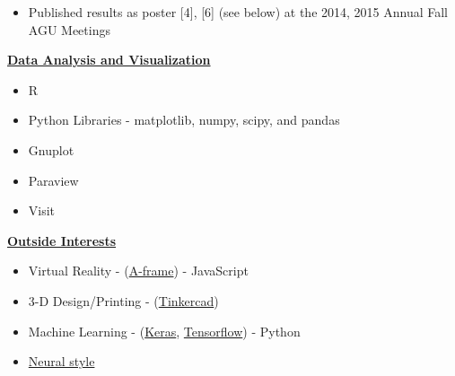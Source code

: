\documentclass[11pt]{ltxdoc}
\begin{document}
\begin{description}
\begin{description}
\begin{itemize}
\begin{itemize}
          	\item Published results as poster [4], [6] (see below) at the 2014, 2015 Annual Fall AGU Meetings
          	
          \end{itemize}
           

      \end{itemize}

    
    \end{description}
    
    \item[] \textbf{\underline{Data Analysis and Visualization}}
    
      \begin{itemize}
      	    	
        \item R
       
        \item Python Libraries - matplotlib, numpy, scipy, and pandas
        
        \item Gnuplot
        
        \item Paraview 
        
        \item Visit
        
        
      \end{itemize}
  
    
    \item[] \textbf{\underline{Outside Interests}}
    
      \begin{itemize}
        \item Virtual Reality - (\href{https://aframe.io/}{A-frame}) - JavaScript
        \item  3-D Design/Printing - (\href{https://www.tinkercad.com/#/}{Tinkercad})
      
        \item  Machine Learning - (\href{https://keras.io}{Keras}, \href{https://www.tensorflow.org/guide/premade_estimators}{Tensorflow}) - Python
        
        \item \href{https://github.com/jcjohnson/neural-style}{Neural style}
      
      \end{itemize}

  \end{description}
\end{document}
